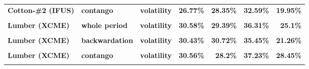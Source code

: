 \documentclass[
  authoryear,
  preprint,
  3p]{elsarticle}
\begin{document}
\begin{longtable}[t]{>{}l>{}l>{}l>{}r>{}r>{}r>{}r}
\textbf{Cotton-\#2 (IFUS)} & \textbf{contango} & \textbf{volatility} & \textcolor[HTML]{4285f4}{\textbf{26.77\%}} & \textcolor[HTML]{4285f4}{\textbf{28.35\%}} & \textcolor[HTML]{4285f4}{\textbf{32.59\%}} & \textcolor[HTML]{4285f4}{\textbf{19.95\%}}\\
\textbf{\cellcolor{gray!10}{Lumber (XCME)}} & \textbf{\cellcolor{gray!10}{whole period}} & \textbf{\cellcolor{gray!10}{mean}} & \textcolor[HTML]{4285f4}{\textbf{\cellcolor{gray!10}{1.9\%}}} & \textcolor[HTML]{4285f4}{\textbf{\cellcolor{gray!10}{-3.58\%}}} & \textcolor[HTML]{4285f4}{\textbf{\cellcolor{gray!10}{11.74\%}}} & \textcolor[HTML]{4285f4}{\textbf{\cellcolor{gray!10}{5.06\%}}}\\
\textbf{Lumber (XCME)} & \textbf{whole period} & \textbf{volatility} & \textcolor[HTML]{4285f4}{\textbf{30.58\%}} & \textcolor[HTML]{4285f4}{\textbf{29.39\%}} & \textcolor[HTML]{4285f4}{\textbf{36.31\%}} & \textcolor[HTML]{4285f4}{\textbf{25.1\%}}\\
\textbf{\cellcolor{gray!10}{Lumber (XCME)}} & \textbf{\cellcolor{gray!10}{backwardation}} & \textbf{\cellcolor{gray!10}{mean}} & \textcolor[HTML]{4285f4}{\textbf{\cellcolor{gray!10}{-8.48\%}}} & \textcolor[HTML]{4285f4}{\textbf{\cellcolor{gray!10}{-2.37\%}}} & \textcolor[HTML]{4285f4}{\textbf{\cellcolor{gray!10}{29.11\%}}} & \textcolor[HTML]{4285f4}{\textbf{\cellcolor{gray!10}{**26.99\%}}}\\
\addlinespace
\textbf{Lumber (XCME)} & \textbf{backwardation} & \textbf{volatility} & \textcolor[HTML]{4285f4}{\textbf{30.43\%}} & \textcolor[HTML]{4285f4}{\textbf{30.72\%}} & \textcolor[HTML]{4285f4}{\textbf{35.45\%}} & \textcolor[HTML]{4285f4}{\textbf{21.26\%}}\\
\textbf{\cellcolor{gray!10}{Lumber (XCME)}} & \textbf{\cellcolor{gray!10}{contango}} & \textbf{\cellcolor{gray!10}{mean}} & \textcolor[HTML]{4285f4}{\textbf{\cellcolor{gray!10}{11.68\%}}} & \textcolor[HTML]{4285f4}{\textbf{\cellcolor{gray!10}{-4.77\%}}} & \textcolor[HTML]{4285f4}{\textbf{\cellcolor{gray!10}{-5.04\%}}} & \textcolor[HTML]{4285f4}{\textbf{\cellcolor{gray!10}{-17.14\%}}}\\
\textbf{Lumber (XCME)} & \textbf{contango} & \textbf{volatility} & \textcolor[HTML]{4285f4}{\textbf{30.56\%}} & \textcolor[HTML]{4285f4}{\textbf{28.2\%}} & \textcolor[HTML]{4285f4}{\textbf{37.23\%}} & \textcolor[HTML]{4285f4}{\textbf{28.45\%}}\\
\textbf{\cellcolor{gray!10}{Orange juice (IFUS)}} & \textbf{\cellcolor{gray!10}{whole period}} & \textbf{\cellcolor{gray!10}{mean}} & \textcolor[HTML]{4285f4}{\textbf{\cellcolor{gray!10}{1.67\%}}} & \textcolor[HTML]{4285f4}{\textbf{\cellcolor{gray!10}{13.87\%}}} & \textcolor[HTML]{4285f4}{\textbf{\cellcolor{gray!10}{14.4\%}}} & \textcolor[HTML]{4285f4}{\textbf{\cellcolor{gray!10}{3.8\%}}}\\

\end{longtable}
\end{document}
